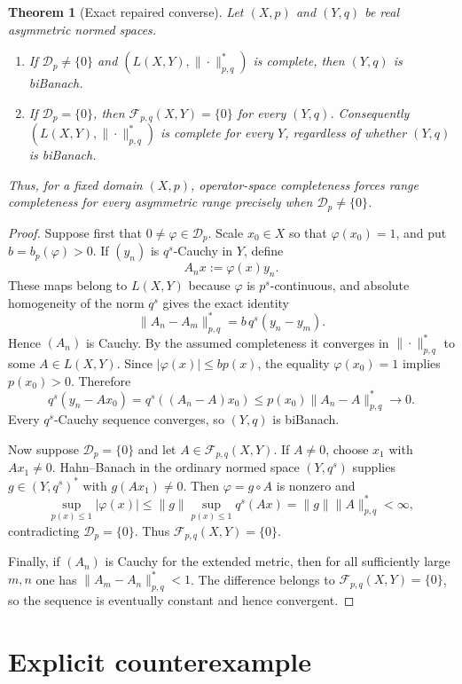 \documentclass[11pt,a4paper]{article}
\newtheorem{theorem}{Theorem}
\newcommand{\D}{\mathcal D}
\newcommand{\F}{\mathcal F}
\begin{document}
\begin{theorem}[Exact repaired converse]\label{thm:dichotomy}
Let $(X,p)$ and $(Y,q)$ be real asymmetric normed spaces.
\begin{enumerate}
\item If $\D_p\neq\{0\}$ and $(L(X,Y),\|\cdot\|^*_{p,q})$ is complete, then $(Y,q)$ is biBanach.
\item If $\D_p=\{0\}$, then $\F_{p,q}(X,Y)=\{0\}$ for every $(Y,q)$. Consequently $(L(X,Y),\|\cdot\|^*_{p,q})$ is complete for every $Y$, regardless of whether $(Y,q)$ is biBanach.
\end{enumerate}
Thus, for a fixed domain $(X,p)$, operator-space completeness forces range completeness for every asymmetric range precisely when $\D_p\neq\{0\}$.
\end{theorem}

\begin{proof}
Suppose first that $0\neq\varphi\in\D_p$.  Scale $x_0\in X$ so that $\varphi(x_0)=1$, and put $b=b_p(\varphi)>0$.  If $(y_n)$ is $q^s$-Cauchy in $Y$, define
\[
 A_nx:=\varphi(x)y_n.
\]
These maps belong to $L(X,Y)$ because $\varphi$ is $p^s$-continuous, and absolute homogeneity of the norm $q^s$ gives the exact identity
\[
 \|A_n-A_m\|^*_{p,q}
 =b\,q^s(y_n-y_m).
\]
Hence $(A_n)$ is Cauchy.  By the assumed completeness it converges in $\|\cdot\|^*_{p,q}$ to some $A\in L(X,Y)$.  Since $|\varphi(x)|\leq b p(x)$, the equality $\varphi(x_0)=1$ implies $p(x_0)>0$.  Therefore
\[
 q^s(y_n-Ax_0)
 =q^s((A_n-A)x_0)
 \leq p(x_0)\|A_n-A\|^*_{p,q}\longrightarrow0.
\]
Every $q^s$-Cauchy sequence converges, so $(Y,q)$ is biBanach.

Now suppose $\D_p=\{0\}$ and let $A\in\F_{p,q}(X,Y)$.  If $A\neq0$, choose $x_1$ with $Ax_1\neq0$.  Hahn--Banach in the ordinary normed space $(Y,q^s)$ supplies $g\in(Y,q^s)^*$ with $g(Ax_1)\neq0$.  Then $\varphi=g\circ A$ is nonzero and
\[
 \sup_{p(x)\leq1}|\varphi(x)|
 \leq \|g\|\sup_{p(x)\leq1}q^s(Ax)
 =\|g\|\|A\|^*_{p,q}<\infty,
\]
contradicting $\D_p=\{0\}$.  Thus $\F_{p,q}(X,Y)=\{0\}$.

Finally, if $(A_n)$ is Cauchy for the extended metric, then for all sufficiently large $m,n$ one has $\|A_m-A_n\|^*_{p,q}<1$.  The difference belongs to $\F_{p,q}(X,Y)=\{0\}$, so the sequence is eventually constant and hence convergent.
\end{proof}

\section{Explicit counterexample}
\end{document}
